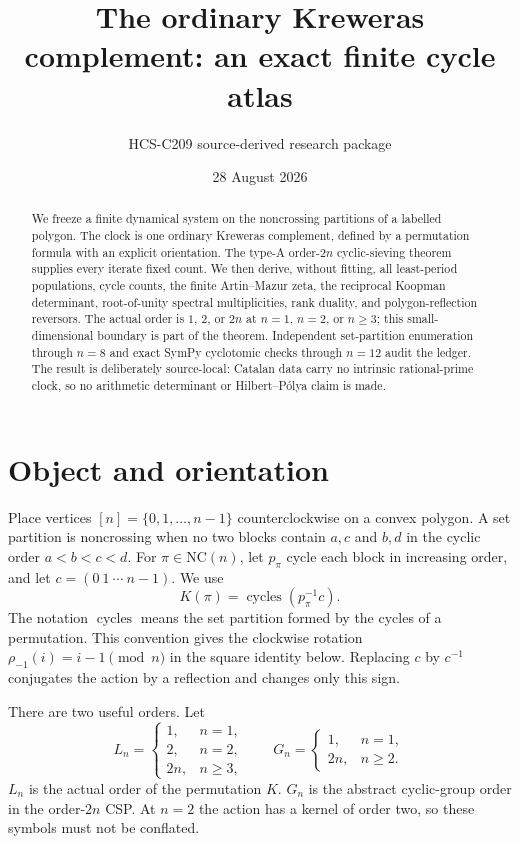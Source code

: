 \documentclass[11pt]{article}
\title{The ordinary Kreweras complement: an exact finite cycle atlas}
\author{HCS-C209 source-derived research package}
\date{28 August 2026}
\theoremstyle{definition}
\newcommand{\NC}{\mathrm{NC}}
\begin{document}
\maketitle

\begin{abstract}
We freeze a finite dynamical system on the noncrossing partitions of a labelled
polygon.  The clock is one ordinary Kreweras complement, defined by a
permutation formula with an explicit orientation.  The type-A order-$2n$
cyclic-sieving theorem supplies every iterate fixed count.  We then derive,
without fitting, all least-period populations, cycle counts, the finite
Artin--Mazur zeta, the reciprocal Koopman determinant, root-of-unity spectral
multiplicities, rank duality, and polygon-reflection reversors.  The actual
order is $1$, $2$, or $2n$ at $n=1$, $n=2$, or $n\geq3$; this small-dimensional
boundary is part of the theorem.  Independent set-partition enumeration
through $n=8$ and exact SymPy cyclotomic checks through $n=12$ audit the ledger.
The result is deliberately source-local: Catalan data carry no intrinsic
rational-prime clock, so no arithmetic determinant or Hilbert--Pólya claim is
made.
\end{abstract}

\section{Object and orientation}
Place vertices $[n]=\{0,1,\ldots,n-1\}$ counterclockwise on a convex polygon.
A set partition is noncrossing when no two blocks contain $a,c$ and $b,d$ in
the cyclic order $a<b<c<d$.  For $\pi\in\NC(n)$, let $p_\pi$ cycle each block
in increasing order, and let $c=(0\ 1\ \cdots\ n-1)$.  We use
\begin{equation}
  K(\pi)=\operatorname{cycles}(p_\pi^{-1}c).                 \label{eq:K}
\end{equation}
The notation $\operatorname{cycles}$ means the set partition formed by the
cycles of a permutation.  This convention gives the clockwise rotation
$\rho_{-1}(i)=i-1\pmod n$ in the square identity below.  Replacing $c$ by
$c^{-1}$ conjugates the action by a reflection and changes only this sign.

There are two useful orders.  Let
\begin{equation}
 L_n=\begin{cases}1,&n=1,\\2,&n=2,\\2n,&n\ge3,\end{cases}\qquad
 G_n=\begin{cases}1,&n=1,\\2n,&n\ge2.\end{cases}                 \label{eq:orders}
\end{equation}
$L_n$ is the actual order of the permutation $K$.  $G_n$ is the abstract
cyclic-group order in the order-$2n$ CSP.  At $n=2$ the action has a kernel of
order two, so these symbols must not be conflated.
\end{document}
